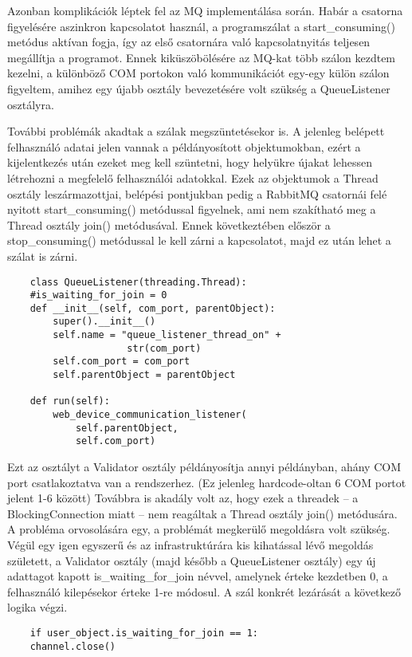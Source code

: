 \documentclass[12pt]{report}
\begin{document}
Azonban komplikációk léptek fel az MQ implementálása során. Habár a csatorna figyelésére aszinkron kapcsolatot használ, a programszálat a start\_consuming() metódus aktívan fogja, így az első csatornára való kapcsolatnyitás teljesen megállítja a programot.
Ennek kiküszöbölésére az MQ-kat több szálon kezdtem kezelni, a különböző COM portokon való kommunikációt egy-egy külön szálon figyeltem, amihez egy újabb osztály bevezetésére volt szükség a QueueListener osztályra.

További problémák akadtak a szálak megszüntetésekor is.
A jelenleg belépett felhasználó adatai jelen vannak a példányosított objektumokban, ezért a kijelentkezés után ezeket meg kell szüntetni, hogy helyükre újakat lehessen létrehozni a megfelelő felhasználói adatokkal.
Ezek az objektumok a Thread osztály leszármazottjai, belépési pontjukban pedig a RabbitMQ csatornái felé nyitott start\_consuming() metódussal figyelnek, ami nem szakítható meg a Thread osztály join() metódusával. Ennek következtében először a stop\_consuming() metódussal le kell zárni a kapcsolatot, majd ez után lehet a szálat is zárni.


\begin{verbatim}
    class QueueListener(threading.Thread):
    #is_waiting_for_join = 0
    def __init__(self, com_port, parentObject):
        super().__init__()
        self.name = "queue_listener_thread_on" +
                     str(com_port)
        self.com_port = com_port
        self.parentObject = parentObject

    def run(self):
        web_device_communication_listener(
            self.parentObject,
            self.com_port)
\end{verbatim}

Ezt az osztályt a Validator osztály példányosítja annyi példányban, ahány COM port csatlakoztatva van a rendszerhez. (Ez jelenleg hardcode-oltan 6 COM portot jelent 1-6 között)
Továbbra is akadály volt az, hogy ezek a threadek -- a BlockingConnection miatt -- nem reagáltak a Thread osztály join() metódusára. A probléma orvosolására egy, a problémát megkerülő megoldásra volt szükség. Végül egy igen egyszerű és az infrastruktúrára kis kihatással lévő megoldás született, a Validator osztály (majd később a QueueListener osztály) egy új adattagot kapott is\_waiting\_for\_join névvel, amelynek érteke kezdetben 0, a felhasználó kilepésekor érteke 1-re módosul. A szál konkrét lezárását a következő logika végzi.

\begin{verbatim}
    if user_object.is_waiting_for_join == 1:
    channel.close()
\end{verbatim}
\end{document}
